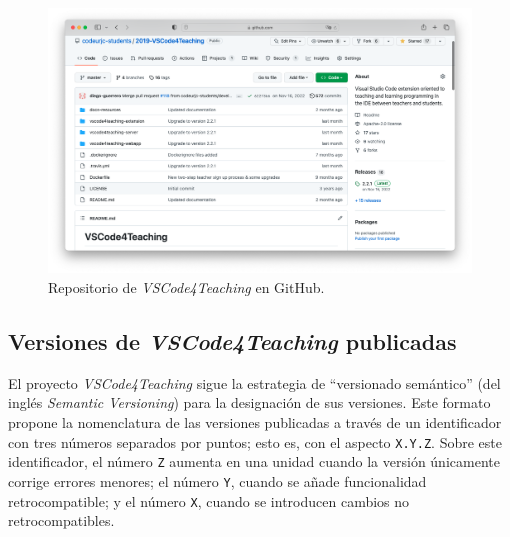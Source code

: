 \begin{figure}[ht]
    \centering
    \includegraphics[width=\textwidth]{imagenes/utilizadas/4-5-distribDespliegue/repoGitHub.png}
    \caption{Repositorio de \textit{VSCode4Teaching} en GitHub.}
    \label{fig:repoGitHub}
\end{figure}

\subsection{Versiones de \textit{VSCode4Teaching} publicadas}
El proyecto \textit{VSCode4Teaching} sigue la estrategia de ``versionado semántico'' (del inglés \textit{Semantic Versioning}) \cite{Deploy_SemVer} para la designación de sus versiones. Este formato propone la nomenclatura de las versiones publicadas a través de un identificador con tres números separados por puntos; esto es, con el aspecto \texttt{X.Y.Z}. Sobre este identificador, el número \texttt{Z} aumenta en una unidad cuando la versión únicamente corrige errores menores; el número \texttt{Y}, cuando se añade funcionalidad retrocompatible; y el número \texttt{X}, cuando se introducen cambios no retrocompatibles.

